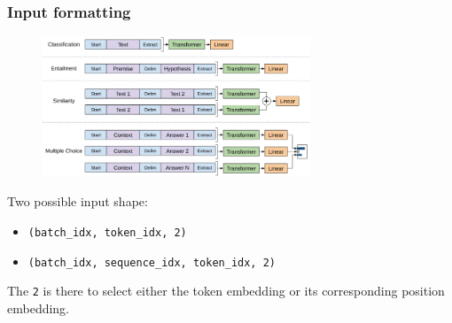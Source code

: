 \documentclass[9pt]{beamer}
\begin{document}
\begin{frame}
  \frametitle{Input formatting}

  \begin{figure}
    \includegraphics[width = 8cm]{images/input_formatting.png}
  \end{figure}

  Two possible input shape:

  \begin{itemize}
  \item \texttt{(batch\_idx, token\_idx, 2)}
  \item \texttt{(batch\_idx, sequence\_idx, token\_idx, 2)}
  \end{itemize}

  \bigskip

  The \texttt{2} is there to select either the token embedding or its
  corresponding position embedding.
\end{frame}



\end{document}
